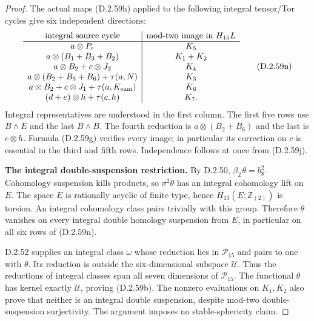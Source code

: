 \begin{proof}
The actual maps \textup{(D.2.59h)} applied to the following
integral tensor/Tor cycles give six independent directions:
\[
 \begin{array}{c|c}
 \text{integral source cycle}&\text{mod-two image in }H_{15}L\\ \hline
 a\otimes P_r&K_5\\
 a\otimes(B_1+B_3+B_2)&K_1+K_2\\
 a\otimes B_2+c\otimes J_2&K_4\\
 a\otimes(B_2+B_5+B_6)+\tau(a,N)&K_3\\
 a\otimes B_2+c\otimes J_1+\tau(a,K_{\rm sum})&K_6\\
 (d+e)\otimes h+\tau(c,h)&K_7.
 \end{array}
 \tag{D.2.59n}
\]
Integral representatives are understood in the first column.
The first five rows use $B\wedge E$ and the last $B\wedge B$.
The fourth reduction is $a\otimes(B_2+B_6)$ and the last is
$e\otimes h$.  Formula \textup{(D.2.59g)} verifies every image;
in particular its correction on $c$ is essential in the third
and fifth rows.  Independence follows at once from
\textup{(D.2.59j)}.

\textbf{The integral double-suspension restriction.}
By D.2.50, $\beta_{\mathbb Z}\theta=b_8^2$.
Cohomology suspension kills products, so $\sigma^2\theta$ has
an integral cohomology lift on $E$.  The space $E$ is rationally
acyclic of finite type, hence $H_{13}(E;\mathbb Z_{(2)})$ is
torsion.  An integral cohomology class pairs trivially with this
group.  Therefore $\theta$ vanishes on every integral double
homology suspension from $E$, in particular on all six rows of
\textup{(D.2.59n)}.

D.2.52 supplies an integral class $\omega$ whose reduction lies
in $\mathcal P_{15}$ and pairs to one with $\theta$.
Its reduction is outside the six-dimensional subspace
$\mathcal U$.  Thus the reductions of integral classes span all
seven dimensions of $\mathcal P_{15}$.  The functional $\theta$
has kernel exactly $\mathcal U$, proving \textup{(D.2.59b)}.
The nonzero evaluations on $K_1,K_2$ also prove that neither is
an integral double suspension, despite mod-two double-suspension
surjectivity.  The argument imposes no stable-sphericity claim.
\end{proof}
